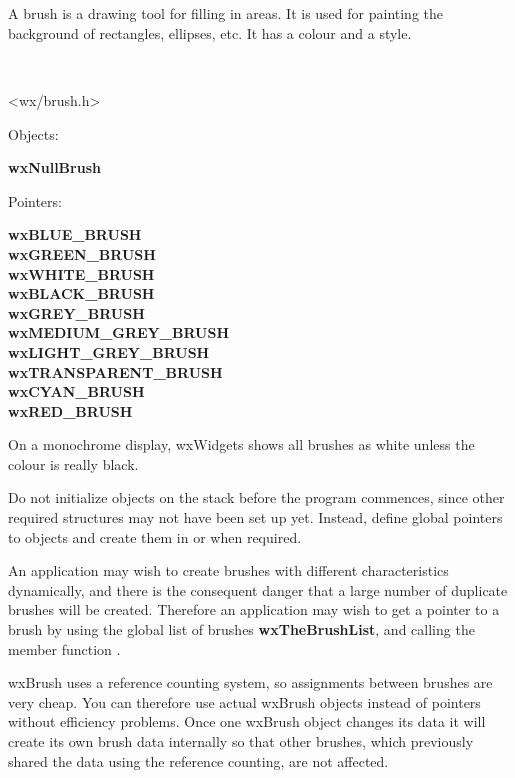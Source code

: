 \section{}\label{wxbrush}

A brush is a drawing tool for filling in areas. It is used for painting
the background of rectangles, ellipses, etc. It has a colour and a
style.


\\


<wx/brush.h>


Objects:

{\bf wxNullBrush}

Pointers:

{\bf wxBLUE\_BRUSH\\
wxGREEN\_BRUSH\\
wxWHITE\_BRUSH\\
wxBLACK\_BRUSH\\
wxGREY\_BRUSH\\
wxMEDIUM\_GREY\_BRUSH\\
wxLIGHT\_GREY\_BRUSH\\
wxTRANSPARENT\_BRUSH\\
wxCYAN\_BRUSH\\
wxRED\_BRUSH}


On a monochrome display, wxWidgets shows
all brushes as white unless the colour is really black.

Do not initialize objects on the stack before the program commences,
since other required structures may not have been set up yet. Instead,
define global pointers to objects and create them in  or
when required.

An application may wish to create brushes with different
characteristics dynamically, and there is the consequent danger that a
large number of duplicate brushes will be created. Therefore an
application may wish to get a pointer to a brush by using the global
list of brushes {\bf wxTheBrushList}, and calling the member function
.

wxBrush uses a reference counting system, so assignments between brushes are very
cheap. You can therefore use actual wxBrush objects instead of pointers without
efficiency problems. Once one wxBrush object changes its data it will create its
own brush data internally so that other brushes, which previously shared the
data using the reference counting, are not affected.

